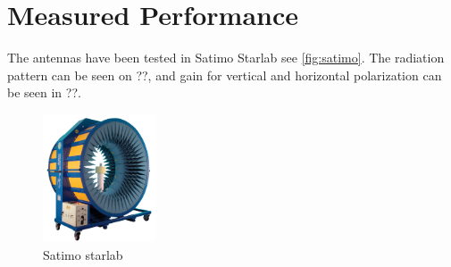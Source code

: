 \section{Measured Performance}

The antennas have been tested in Satimo Starlab see \autoref{fig:satimo}. 
The radiation pattern can be seen on ??, and gain for vertical and horizontal polarization can be seen in ??. 


\begin{figure}[H]
\centering
\includegraphics[width=0.3\textwidth]{figure/starlab.png}
\caption{Satimo starlab}
\label{fig:satimo}
\end{figure}
